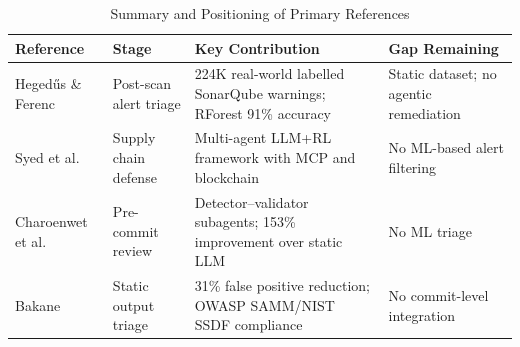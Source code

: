\begin{table}[htbp]
  \centering
  \caption{Summary and Positioning of Primary References}
  \label{tab:litreview}
  \renewcommand{\arraystretch}{1.35}
  \begin{tabular}{p{3cm}p{2.5cm}p{4cm}p{2.5cm}}
    \toprule
    \textbf{Reference} & \textbf{Stage} &
    \textbf{Key Contribution} & \textbf{Gap Remaining} \\
    \midrule
    Heged\H{u}s \& Ferenc \cite{hegedus2022sca} &
      Post-scan alert triage &
      224K real-world labelled SonarQube warnings; RForest 91\% accuracy &
      Static dataset; no agentic remediation \\
    Syed et al.\ \cite{syed2025agentic} &
      Supply chain defense &
      Multi-agent LLM+RL framework with MCP and blockchain &
      No ML-based alert filtering \\
    Charoenwet et al.\ \cite{charoenwet2026agenticscr} &
      Pre-commit review &
      Detector--validator subagents; 153\% improvement over static LLM &
      No ML triage \\
    Bakane \cite{bakane2025thesis} &
      Static output triage &
      31\% false positive reduction; OWASP SAMM/NIST SSDF compliance &
      No commit-level integration \\
    \bottomrule
  \end{tabular}
\end{table}

